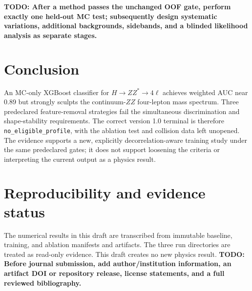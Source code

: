 \documentclass[11pt]{article}
\newcommand{\todo}[1]{\textcolor{red!70!black}{\textbf{TODO: #1}}}
\begin{document}
\todo{After a method passes the unchanged OOF gate, perform exactly one held-out MC test; subsequently design systematic variations, additional backgrounds, sidebands, and a blinded likelihood analysis as separate stages.}

\section{Conclusion}

An MC-only XGBoost classifier for $H\to ZZ^{*}\to4\ell$ achieves weighted AUC near 0.89 but strongly sculpts the continuum-$ZZ$ four-lepton mass spectrum. Three predeclared feature-removal strategies fail the simultaneous discrimination and shape-stability requirements. The correct version 1.0 terminal is therefore \texttt{no\_eligible\_profile}, with the ablation test and collision data left unopened. The evidence supports a new, explicitly decorrelation-aware training study under the same predeclared gates; it does not support loosening the criteria or interpreting the current output as a physics result.

\section*{Reproducibility and evidence status}

The numerical results in this draft are transcribed from immutable baseline, training, and ablation manifests and artifacts. The three run directories are treated as read-only evidence. This draft creates no new physics result. \todo{Before journal submission, add author/institution information, an artifact DOI or repository release, license statements, and a full reviewed bibliography.}


\small

\end{document}

